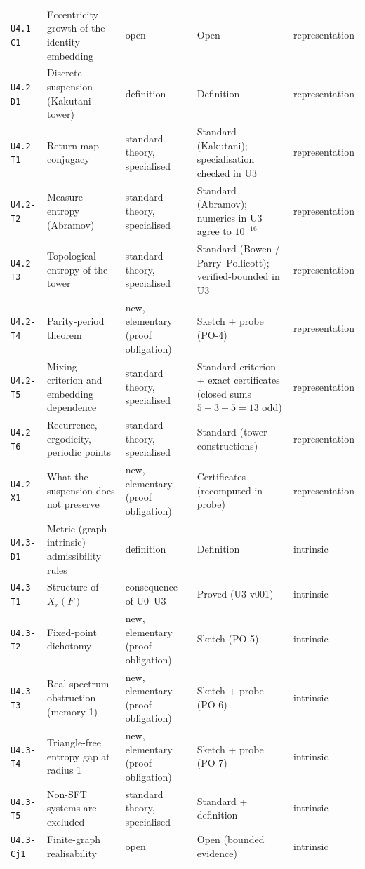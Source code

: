 \documentclass[11pt]{article}
\begin{document}
\begin{longtable}{@{}p{1.25cm}p{4.9cm}p{3.0cm}p{3.6cm}p{1.6cm}@{}}
\texttt{U4.1-C1} & Eccentricity growth of the identity embedding & open & Open & representation\\
\texttt{U4.2-D1} & Discrete suspension (Kakutani tower) & definition & Definition & representation\\
\texttt{U4.2-T1} & Return-map conjugacy & standard theory, specialised & Standard (Kakutani); specialisation checked in U3 & representation\\
\texttt{U4.2-T2} & Measure entropy (Abramov) & standard theory, specialised & Standard (Abramov); numerics in U3 agree to $10^{-16}$ & representation\\
\texttt{U4.2-T3} & Topological entropy of the tower & standard theory, specialised & Standard (Bowen / Parry--Pollicott); verified-bounded in U3 & representation\\
\texttt{U4.2-T4} & Parity-period theorem & new, elementary (proof obligation) & Sketch + probe (PO-4) & representation\\
\texttt{U4.2-T5} & Mixing criterion and embedding dependence & standard theory, specialised & Standard criterion + exact certificates (closed sums $5+3+5=13$ odd) & representation\\
\texttt{U4.2-T6} & Recurrence, ergodicity, periodic points & standard theory, specialised & Standard (tower constructions) & representation\\
\texttt{U4.2-X1} & What the suspension does not preserve & new, elementary (proof obligation) & Certificates (recomputed in probe) & representation\\
\texttt{U4.3-D1} & Metric (graph-intrinsic) admissibility rules & definition & Definition & intrinsic\\
\texttt{U4.3-T1} & Structure of $X_r(F)$ & consequence of U0--U3 & Proved (U3 v001) & intrinsic\\
\texttt{U4.3-T2} & Fixed-point dichotomy & new, elementary (proof obligation) & Sketch (PO-5) & intrinsic\\
\texttt{U4.3-T3} & Real-spectrum obstruction (memory 1) & new, elementary (proof obligation) & Sketch + probe (PO-6) & intrinsic\\
\texttt{U4.3-T4} & Triangle-free entropy gap at radius 1 & new, elementary (proof obligation) & Sketch + probe (PO-7) & intrinsic\\
\texttt{U4.3-T5} & Non-SFT systems are excluded & standard theory, specialised & Standard + definition & intrinsic\\
\texttt{U4.3-Cj1} & Finite-graph realisability & open & Open (bounded evidence) & intrinsic\\

\end{longtable}
\end{document}
